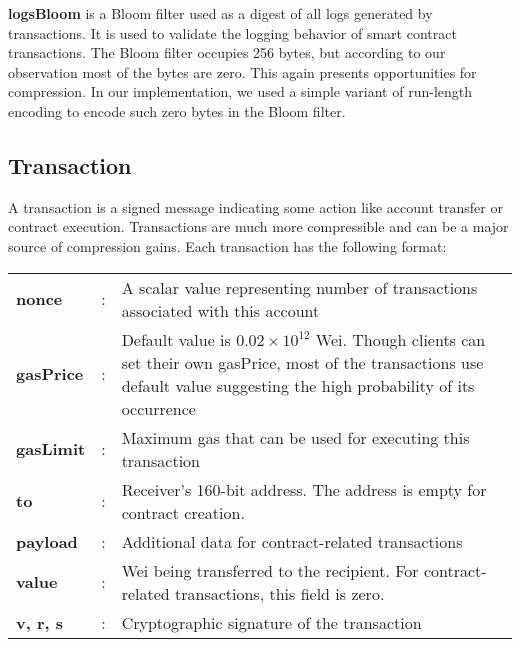 \textbf{logsBloom} is a Bloom filter used as a digest of all logs generated by transactions.
It is used to validate the logging behavior of smart contract transactions. The Bloom filter occupies 256 bytes,
but according to our observation most of the bytes are zero. This again presents opportunities for compression.
In our implementation, we used a simple variant of run-length encoding to encode such zero bytes in the Bloom filter.

\subsection{Transaction}

A transaction is a signed message indicating some action like account transfer or contract execution.
Transactions are much more compressible and can be a major source of compression gains.
Each transaction has the following format:

\begin{table}[H]
	\centering
	\begin{tabular}{>{\bfseries}l c p{}}
  nonce&:& A scalar value representing number of transactions associated with this account\\
	gasPrice&:& \par{Default value is $0.02\times10^{12}$ Wei. Though clients can set their own gasPrice, most of the transactions use default value suggesting the high probability of its occurrence} \\
  gasLimit&:& Maximum gas that can be used for executing this transaction\\
  to&:& Receiver's 160-bit address. The address is empty for contract creation.\\
  payload&:& Additional data for contract-related transactions\\
  value&:& Wei being transferred to the recipient. For contract-related transactions, this field is zero.\\
  v, r, s&:& Cryptographic signature of the transaction\\
\end{tabular}
\end{table}

